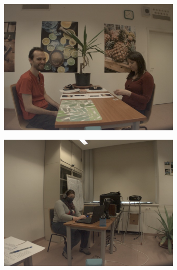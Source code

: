 \begin{figure}
\begin{subfigure}[b]{0.45\linewidth}
    \end{subfigure}
    \begin{subfigure}[b]{0.45\linewidth}
        \includegraphics[width=\linewidth]{figures/video_examples/video_example_table_2.png}
    \end{subfigure}
    \begin{subfigure}[b]{0.45\linewidth}
        \includegraphics[width=\linewidth]{figures/video_examples/video_example_mask.png}
    \end{subfigure}
    \begin{subfigure}[b]{0.45\linewidth}

\end{subfigure}
\end{figure}
